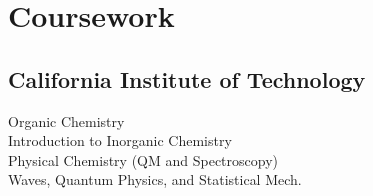 \documentclass[letterpaper]{deedy-resume} %
\begin{document}
\begin{minipage}[t]{0.39\textwidth}
\section{Coursework}

\subsection{California Institute of \newline Technology}
Organic Chemistry\\
Introduction to Inorganic Chemistry\\
Physical Chemistry (QM and Spectroscopy) \\
Waves, Quantum Physics, and Statistical Mech. \\


\sectionspace 









\end{minipage}
\end{document}
